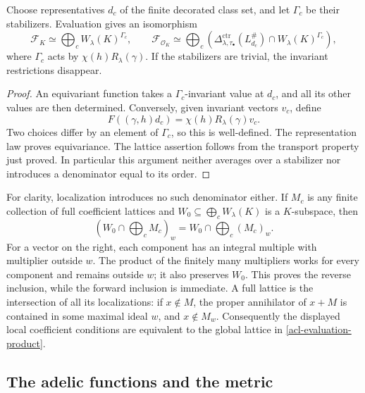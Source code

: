 \begin{proposition}
\label{acl-class-evaluation}
Choose representatives $d_c$ of the finite decorated class set,
and let $\Gamma_c$ be their stabilizers. Evaluation gives an
isomorphism
\begin{equation}\label{acl-evaluation-product}
 \mathcal F_K\simeq\bigoplus_c W_\lambda(K)^{\Gamma_c},
 \qquad
 \mathcal F_{\mathcal O_K}\simeq
   \bigoplus_c\left(
        \Delta_{\lambda,\tau_\bullet}^{\mathrm{ctr}}(L_{d_c}^\#)
                           \cap W_\lambda(K)^{\Gamma_c}\right),
\end{equation}
where $\Gamma_c$ acts by $\chi(h)R_\lambda(\gamma)$.
If the stabilizers are trivial, the invariant restrictions disappear.
\end{proposition}
\begin{proof}
An equivariant function takes a $\Gamma_c$-invariant value at
$d_c$, and all its other values are then determined. Conversely,
given invariant vectors $v_c$, define
\[
                     F((\gamma,h)d_c)
                               =\chi(h)R_\lambda(\gamma)v_c.
\]
Two choices differ by an element of $\Gamma_c$, so this is
well-defined. The representation law proves equivariance.
The lattice assertion follows from the transport property just
proved. In particular this argument neither averages over a
stabilizer nor introduces a denominator equal to its order.
\end{proof}

For clarity, localization introduces no such denominator either.
If $M_c$ is any finite collection of full coefficient lattices and
$W_0\subseteq\bigoplus_c W_\lambda(K)$ is a $K$-subspace, then
\begin{equation}\label{acl-localization}
 \left(W_0\cap\bigoplus_cM_c\right)_w
                     =W_0\cap\bigoplus_c(M_c)_w.
\end{equation}
For a vector on the right, each component has an integral
multiple with multiplier outside $w$. The product of the
finitely many multipliers works for every component and remains
outside $w$; it also preserves $W_0$. This proves the reverse
inclusion, while the forward inclusion is immediate. A full
lattice is the intersection of all its localizations: if
$x\notin M$, the proper annihilator of $x+M$ is contained in
some maximal ideal $w$, and $x\notin M_w$.
Consequently the displayed local coefficient conditions are
equivalent to the global lattice in
\eqref{acl-evaluation-product}.

\subsection{The adelic functions and the metric}

